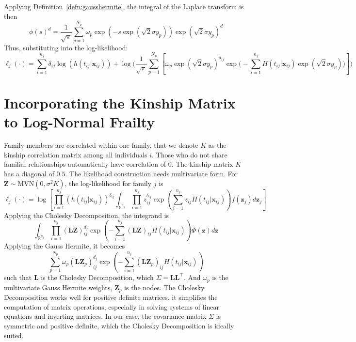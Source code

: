 \documentclass[preprint,12pt]{elsarticle}
\begin{document}
\noindent
Applying Definition~\ref{defn:gausshermite}, the integral of the Laplace transform is then
\begin{equation}
    \phi(s)^d=\frac{1}{\sqrt{\pi}}\sum_{p=1}^{N_p}\omega_p\exp(-s\exp(\sqrt{2}\sigma y_p))\exp(\sqrt{2}\sigma y_p)^d
\end{equation}
Thus, substituting into the log-likelihood:
\begin{equation}
    \ell_j(\cdot)=\sum_{i=1}^{n_j}\delta_{ij}\log(h(t_{ij}|\mathbf{x}_{ij}))+\log\Big (\frac{1}{\sqrt{\pi}}\sum_{p=1}^{N_p}\left [\omega_p\exp(\sqrt{2}\sigma y_p)^{d_{ij}}\exp\Big (-\sum_{i=1}^{n_j}H(t_{ij}|\mathbf{x}_{ij})\exp(\sqrt{2}\sigma y_p)\Big )\right ]\Big )
\end{equation}

\section{Incorporating the Kinship Matrix to Log-Normal Frailty}
Family members are correlated within one family, that we denote $K$ as the kinship correlation matrix among all individuals $i$. Those who do not share familial relationships automatically have correlation of $0$. The kinship matrix $K$ has a diagonal of $0.5$. The likelihood construction needs multivariate form. For $\mathbf{Z}\sim\text{MVN}(0,\sigma^2K)$, the log-likelihood for family $j$ is 
\begin{equation}
    \ell_j(\cdot)=\log\left [\prod_{i=1}^{n_j}(h(t_{ij}|\mathbf{x}_{ij}))^{\delta_{ij}}\int_{\mathbb{R}^{n_j}}\prod_{i=1}^{n_j}z_{ij}^{\delta_{ij}}\exp(\sum_{i=1}^{n_j}z_{ij}H(t_{ij}|\mathbf{x}_{ij}))f(\mathbf{z}_j)d\mathbf{z}_j\right ]
\end{equation}
Applying the Cholesky Decomposition, the integrand is 
\begin{equation}
    \int_{\mathbb{R}^{n_j}}\prod_{i=1}^{n_j}(\mathbf{L}\mathbf{Z})_{ij}^{d_j}\exp(-\sum_{i=1}^{n_j}(\mathbf{L}\mathbf{Z})_{ij} H(t_{ij}|\mathbf{x}_{ij}))\Phi (\mathbf{z})d\mathbf{z}
\end{equation}
Applying the Gauss Hermite, it becomes
\begin{equation}
    \sum_{p=1}^{N_p}\omega_p (\mathbf{L}\mathbf{Z}_p)_{ij}^{d_j}\exp(-\sum_{i=1}^{n_j}(\mathbf{L}\mathbf{Z}_p)_{ij} H(t_{ij}|\mathbf{x}_{ij}))
\end{equation}
such that $\mathbf{L}$ is the Cholesky Decomposition, which $\Sigma=\mathbf{L}\mathbf{L}^{\top}$. And $\omega_p$ is the multivariate Gauss Hermite weights, $\mathbf{Z}_p$ is the nodes. The Cholesky Decomposition works well for positive definite matrices, it simplifies the computation of matrix operations, especially in solving systems of linear equations and inverting matrices. In our case, the covariance matrix $\Sigma$ is symmetric and positive definite, which the Cholesky Decomposition is ideally suited. 
\end{document}
